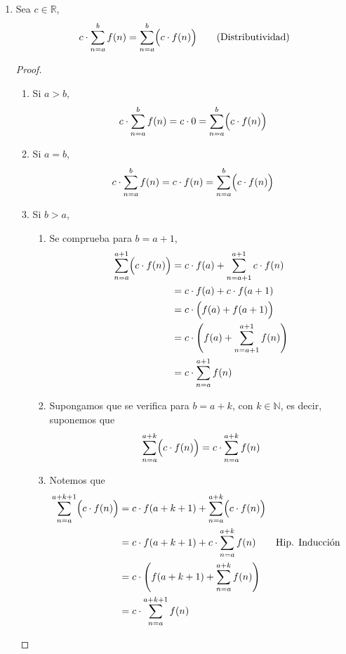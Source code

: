\documentclass[11pt]{article}
\newcommand{\N}{\mathbb{N}}
\newcommand{\R}{\mathbb{R}}
\begin{document}
\begin{enumerate}[label=\alph*)]
  \item Sea $c\in \R$, \[c\cdot \sum_{n=a}^{b} f(n) = \sum_{n=a}^{b} \Bigl(c \cdot f(n)\Bigr) \qquad \text{(Distributividad)}\]
    \begin{proof}\leavevmode
      \begin{enumerate}[label=\Roman*)]
        \item Si $a>b$, \begin{align*}
          c\cdot \sum_{n=a}^{b} f(n) = c\cdot 0 = \sum_{n=a}^{b} \Bigl(c \cdot f(n)\Bigr)
        \end{align*}
        \item Si $a=b$, \begin{align*}
          c\cdot \sum_{n=a}^{b} f(n) = c\cdot f(n) = \sum_{n=a}^{b} \Bigl(c \cdot f(n)\Bigr) 
        \end{align*}
        \item Si $b>a$,
          \begin{enumerate}[label=\roman*)]
          \item Se comprueba para $b=a+1$, \begin{align*}
            \sum_{n=a}^{a+1} \Bigl(c \cdot f(n)\Bigr) &= c\cdot f(a) + \sum_{n=a+1}^{a+1} c\cdot f(n)\\
            &= c\cdot f(a) + c\cdot f(a+1)\\
            &= c \cdot \Bigl(f(a) + f(a+1)\Bigr)\\
            &= c\cdot \Biggl(f(a) + \sum_{n=a+1}^{a+1} f(n)\Biggr)\\
            &= c\cdot \sum_{n=a}^{a+1} f(n)
          \end{align*}
          \item Supongamos que se verifica para $b=a+k$, con $k\in \N$, es decir, suponemos que \begin{align*}
            \sum_{n=a}^{a+k} \Bigl(c \cdot f(n)\Bigr) = c\cdot \sum_{n=a}^{a+k} f(n) 
          \end{align*}
          \item Notemos que \begin{align*}
            \sum_{n=a}^{a+k+1} \Bigl(c \cdot f(n)\Bigr) &= c\cdot f(a+k+1) + \sum_{n=a}^{a+k} \Bigl(c \cdot f(n)\Bigr)\\
            &= c\cdot f(a+k+1) + c\cdot \sum_{n=a}^{a+k} f(n) && \text{Hip. Inducción}\\
            &= c \cdot \Biggl(f(a+k+1)+ \sum_{n=a}^{a+k} f(n)\Biggr)\\
            &= c\cdot \sum_{n=a}^{a+k+1} f(n)
          \end{align*}
          \end{enumerate}
        \end{enumerate}
    \end{proof}


\end{enumerate}
\end{document}
